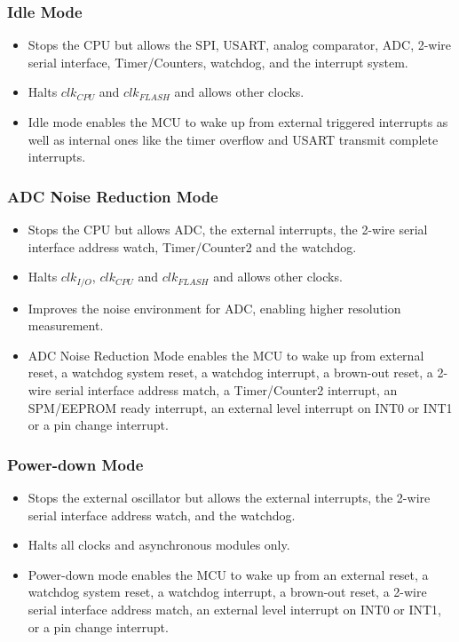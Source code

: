 \documentclass{article}
\begin{document}
\subsubsection{Idle Mode}
\begin{itemize}
    \item Stops the CPU but allows the SPI, USART, analog comparator, ADC, 2-wire serial interface, Timer/Counters, watchdog, and the interrupt
    system.
    \item Halts $clk_{CPU}$ and  $clk_{FLASH}$ and allows other clocks.
    \item Idle mode enables the MCU to wake up from external triggered interrupts as well as internal ones like the timer overflow and USART transmit complete interrupts.
\end{itemize}

\subsubsection{ADC Noise Reduction Mode}
\begin{itemize}
    \item Stops the CPU but allows ADC, the external interrupts, the 2-wire serial interface address watch, Timer/Counter2 and the watchdog.
    \item Halts $clk_{I/O}$, $clk_{CPU}$ and  $clk_{FLASH}$ and allows other clocks.
    \item Improves the noise environment for ADC, enabling higher resolution measurement.
    \item ADC Noise Reduction Mode enables the MCU to wake up from external reset, a watchdog system reset, a watchdog interrupt, a brown-out reset, a 2-wire serial interface address match, a Timer/Counter2 interrupt, an SPM/EEPROM ready interrupt, an external level interrupt on INT0 or INT1 or a pin change interrupt.
\end{itemize}

\subsubsection{Power-down Mode}
\begin{itemize}
    \item Stops the external oscillator but allows the external interrupts, the 2-wire serial interface address watch, and the watchdog.
    \item Halts all clocks and asynchronous modules only.
    \item Power-down mode enables the MCU to wake up from an external reset, a watchdog system reset, a watchdog interrupt, a brown-out reset, a 2-wire serial interface address match, an external level interrupt on INT0 or INT1, or a pin change interrupt.
\end{itemize}
\end{document}
